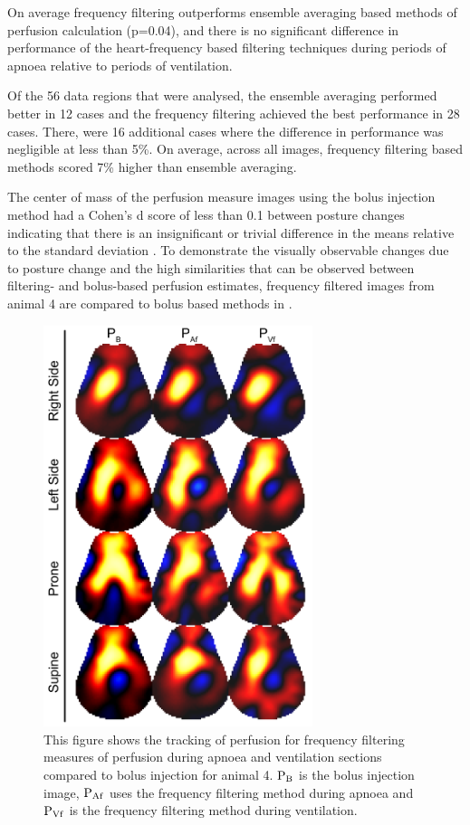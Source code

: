 On average frequency filtering outperforms ensemble averaging based methods
of perfusion calculation (p=0.04), and there is no significant difference in
performance of the heart-frequency based 
filtering techniques during periods of apnoea relative to periods of ventilation.

Of the 56 data regions that were analysed,
the ensemble averaging performed better in 12 cases and the frequency 
filtering achieved the best performance in 28 cases. There, were 16 additional cases 
where the difference in performance was negligible at less than 5\%. On 
average, across all images, frequency filtering based methods scored
7\% higher than ensemble averaging.

The center of mass of the perfusion 
measure images using the bolus injection method had a Cohen's d score of less than 0.1 
between posture changes
indicating that there is an insignificant or trivial difference in the means relative
to the standard deviation \parencite{cohen_statistical_1977}. 
To demonstrate the visually observable changes due to posture change and the 
high similarities that can be observed between filtering- and bolus-based 
perfusion estimates, frequency filtered images from 
animal 4 are compared to bolus based methods in .

\begin{figure}[H]
\centering
\includegraphics[width=0.7\textwidth]{chapter3-perfusion_analysis/imgs/fig-discussionSample.pdf}
\caption[Example perfusion images]{\label{fig:discussionSample}%
		This figure shows the tracking of perfusion for frequency filtering measures
		of perfusion during apnoea and ventilation sections compared to bolus injection
		for animal 4.
${\rm P_{B}}$ is the bolus injection image, 
${\rm P_{Af}}$ uses the frequency filtering method during apnoea and
${\rm P_{Vf}}$ is the frequency filtering method during ventilation.
}
\end{figure}

